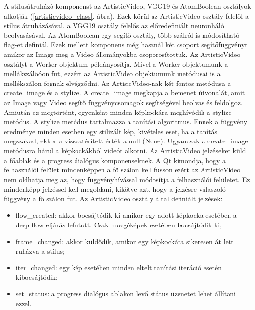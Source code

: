 \documentclass[12pt, a4paper, oneside]{book}
\theoremstyle{tetel}
\begin{document}
A stílusátruházó komponenst az ArtisticVideo, VGG19 és AtomBoolean osztályok alkotják (\ref{artisticvideo_class}. ábra). Ezek körül az ArtisticVideo osztály felelől a stílus átruházásával, a VGG19 osztály felelős az előredefiniált neuronháló beolvasásával. Az AtomBoolean egy segítő osztály, több szálról is módosítható flag-et definiál. Ezek mellett komponens még használ két csoport segítőfüggvényt amikor az Image meg a Video állományokba csoporosítottuk.
\newline
\indent
Az ArtisticVideo osztályt a Worker objektum példányosítja. Mivel a Worker objektumunk a mellákszálöóon fut, ezzért az ArtisticVideo objektumunk metódusai is a mellékszálon fognak elvégződni. Az ArtisicVideo-nak két fontos metódusa a create\_image és a stylize. A create\_image megkapja a bemenet útvonalát, amit az Image vagy Video segítő függvénycsomagok segítségével beolvas és feldolgoz. Amiután ez megtörtént, egyenként minden képkockára meghívódik a stylize metódus. A stylize metódus tartalmazza a tanítási algoritmus. Ennek a függvény eredménye minden esetben egy stilizált kép, kivételes eset, ha a tanítás megszakad, ekkor a visszatérített érték a null (None). Ugyancsak a create\_image metódusra hárul a képkockákból videót alkotni. 
\newline
\indent
Az ArtisticVideo jelzéseket küld a főablak és a progress dialógus komponenseknek. A Qt kimondja, hogy a felhasználói felület mindenképpen a fő szálon kell fusson ezért az ArtisticVideo nem oldhatja meg az, hogy függvényhívással módosítja a felhasználói felületet. Ez mindenképp jelzéssel kell megoldani, kikötve azt, hogy a jelzésre válaszoló függvény a fő szálon fut. Az ArtisticVideo osztály által definiált jelzések:

\begin{itemize}
	\item flow\_created: akkor bocsájtódik ki amikor egy adott képkocka esetében a deep flow eljárás lefutott. Csak mozgóképek esetében bocsájtódik ki;
	\item frame\_changed: akkor küldődik, amikor egy képkockára sikeresen át lett ruházva a stílus;
	\item iter\_changed: egy kép esetében minden eltelt tanítási iteráció esetén kibocsájtódik;
	\item set\_status: a progress dialógus ablakon levő státus üzenetet lehet állítani ezzel.
\end{itemize}
\end{document}
